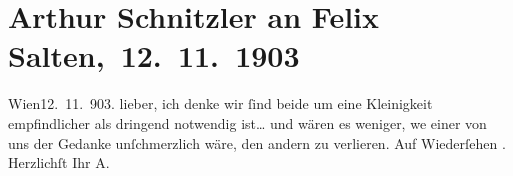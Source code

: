

         
         \renewcommand{\erwaehntePersonen}{Personen: Felix Salten}
         \renewcommand{\erwaehnteOrte}{Orte: Wien}
         \renewcommand{\erwaehnteWerke}{}
               \section[ Arthur Schnitzler an Felix Salten, 12. 11. 1903]{ Arthur Schnitzler an Felix Salten, 12. 11. 1903}\nopagebreak{}\rehead{ }\begin{ledgroupsized}[t]{13cm}\normalsize\beginnumbering \toendnotes[C]{\smallbreak\pagebreak[2]} 
\toendnotes[C]{\smallbreak}\pstart
           \raggedleft{}{\pb}Wien12. 11. 903.\pend
           \pstart
           lieber, ich denke wir ſind beide um eine Kleinigkeit empfindlicher
               als dringend notwendig ist{\dots} und wären es weniger, we{\geminationn} einer von uns der Gedanke unſchmerzlich wäre, den
               andern zu verlieren. Auf Wiederſehen \label{K_L02990-1v}\label{K_L02990-1h}. Herzlichſt Ihr\pend
           \pstart \spacefill\mbox{A.}\pend{}
         
         \endnumbering{}\end{ledgroupsized}  \newcommand{\dateiname}{L02990}\newcommand{\titel}{Arthur Schnitzler an Felix Salten, 12. 11. 1903}\newcommand{\editorInnen}{Martin Anton Müller und Laura Untner}
      